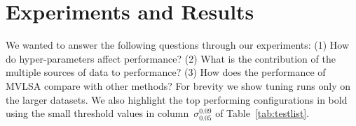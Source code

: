 \documentclass[11pt]{article}
\begin{document}


\section{Experiments and Results}
\label{sec:exp}
We wanted to answer the following questions through our experiments:
(1) How do hyper-parameters affect performance? (2) What is the
contribution of the multiple sources of data to performance? (3) How
does the performance of MVLSA compare with other methods? For brevity
we show tuning runs only on the larger datasets. We also highlight the top
performing configurations in bold using the small threshold values in
column~$\sigma_{0.05}^{0.09}$ of Table~\ref{tab:testlist}.
\end{document}
